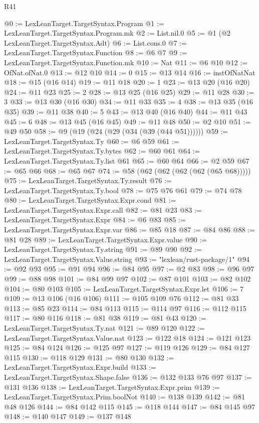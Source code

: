 \begin{lexlean}{R41}
\begin{coremodule}
{{{{{{{{{{{{{{{{{{{{{{{{{{{{{{{{{{{{{{{{{{{{{{{{{{{{{{{{{{{{{{{{{{{{{{{{{{{{{{{{{{{{{{{@0 := LexLeanTarget.TargetSyntax.Program
@1 := LexLeanTarget.TargetSyntax.Program.mk
@2 := List.nil.{0}
@5 := @1 (@2 LexLeanTarget.TargetSyntax.Adt)
@6 := List.cons.{0}
@7 := LexLeanTarget.TargetSyntax.Function
@8 := @6 @7
@9 := LexLeanTarget.TargetSyntax.Function.mk
@10 := Nat
@11 := @6 @10
@12 := OfNat.ofNat.{0}
@13 := @12 @10
@14 := 0
@15 := @13 @14
@16 := instOfNatNat
@18 := @15 (@16 @14)
@19 := @11 @18
@20 := 1
@23 := @13 @20 (@16 @20)
@24 := @11 @23
@25 := 2
@28 := @13 @25 (@16 @25)
@29 := @11 @28
@30 := 3
@33 := @13 @30 (@16 @30)
@34 := @11 @33
@35 := 4
@38 := @13 @35 (@16 @35)
@39 := @11 @38
@40 := 5
@43 := @13 @40 (@16 @40)
@44 := @11 @43
@45 := 6
@48 := @13 @45 (@16 @45)
@49 := @11 @48
@50 := @2 @10
@51 := @49 @50
@58 := @9 (@19 (@24 (@29 (@34 (@39 (@44 @51))))))
@59 := LexLeanTarget.TargetSyntax.Ty
@60 := @6 @59
@61 := LexLeanTarget.TargetSyntax.Ty.bytes
@62 := @60 @61
@64 := LexLeanTarget.TargetSyntax.Ty.list @61
@65 := @60 @64
@66 := @2 @59
@67 := @65 @66
@68 := @65 @67
@74 := @58 (@62 (@62 (@62 (@62 (@65 @68)))))
@75 := LexLeanTarget.TargetSyntax.Ty.result
@76 := LexLeanTarget.TargetSyntax.Ty.bool
@78 := @75 @76 @61
@79 := @74 @78
@80 := LexLeanTarget.TargetSyntax.Expr.cond
@81 := LexLeanTarget.TargetSyntax.Expr.call
@82 := @81 @23
@83 := LexLeanTarget.TargetSyntax.Expr
@84 := @6 @83
@85 := LexLeanTarget.TargetSyntax.Expr.var
@86 := @85 @18
@87 := @84 @86
@88 := @81 @28
@89 := LexLeanTarget.TargetSyntax.Expr.value
@90 := LexLeanTarget.TargetSyntax.Ty.string
@91 := @89 @90
@92 := LexLeanTarget.TargetSyntax.Value.string
@93 := "lexlean/rust-package/1"
@94 := @92 @93
@95 := @91 @94
@96 := @84 @95
@97 := @2 @83
@98 := @96 @97
@99 := @88 @98
@101 := @84 @99 @97
@102 := @87 @101
@103 := @82 @102
@104 := @80 @103
@105 := LexLeanTarget.TargetSyntax.Expr.let
@106 := 7
@109 := @13 @106 (@16 @106)
@111 := @105 @109 @76
@112 := @81 @33
@113 := @85 @23
@114 := @84 @113
@115 := @114 @97
@116 := @112 @115
@117 := @80 @116
@118 := @81 @38
@119 := @81 @43
@120 := LexLeanTarget.TargetSyntax.Ty.nat
@121 := @89 @120
@122 := LexLeanTarget.TargetSyntax.Value.nat
@123 := @122 @18
@124 := @121 @123
@125 := @84 @124
@126 := @125 @97
@127 := @119 @126
@129 := @84 @127 @115
@130 := @118 @129
@131 := @80 @130
@132 := LexLeanTarget.TargetSyntax.Expr.build
@133 := LexLeanTarget.TargetSyntax.Shape.false
@136 := @132 @133 @76 @97
@137 := @131 @136
@138 := LexLeanTarget.TargetSyntax.Expr.prim
@139 := LexLeanTarget.TargetSyntax.Prim.boolNot
@140 := @138 @139
@142 := @81 @48 @126
@144 := @84 @142 @115
@145 := @118 @144
@147 := @84 @145 @97
@148 := @140 @147
@149 := @137 @148
}}}}}}}}}}}}}}}}}}}}}}}}}}}}}}}}}}}}}}}}}}}}}}}}}}}}}}}}}}}}}}}}}}}}}}}}}}}}}}}}}}}}}}}
\end{coremodule}
\end{lexlean}
